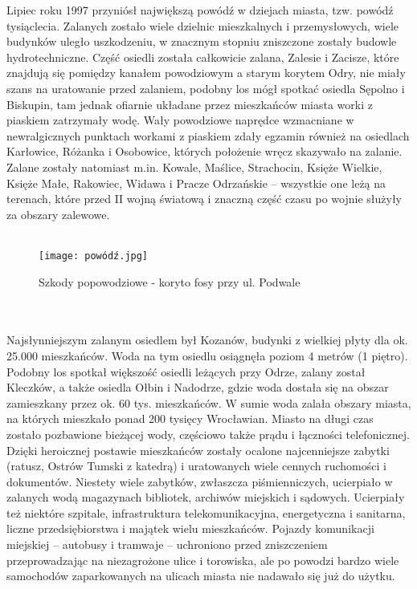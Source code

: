 \documentclass[12pt]{article}
\begin{document}
Lipiec roku 1997 przyniósł największą powódź w dziejach miasta, tzw. powódź tysiąclecia. Zalanych zostało wiele dzielnic mieszkalnych i przemysłowych, wiele budynków uległo uszkodzeniu, w znacznym stopniu zniszczone zostały budowle hydrotechniczne. Część osiedli została całkowicie zalana, Zalesie i Zacisze, które znajdują się pomiędzy kanałem powodziowym a starym korytem Odry, nie miały szans na uratowanie przed zalaniem, podobny los mógł spotkać osiedla Sępolno i Biskupin, tam jednak ofiarnie układane przez mieszkańców miasta worki z piaskiem zatrzymały wodę. Wały powodziowe naprędce wzmacniane w newralgicznych punktach workami z piaskiem zdały egzamin również na osiedlach Karłowice, Różanka i Osobowice, których położenie wręcz skazywało na zalanie. Zalane zostały natomiast m.in. Kowale, Maślice, Strachocin, Księże Wielkie, Księże Małe, Rakowiec, Widawa i Pracze Odrzańskie – wszystkie one leżą na terenach, które przed II wojną światową i znaczną część czasu po wojnie służyły za obszary zalewowe.\\\\
\begin{figure}[h]
    \centering
    \texttt{[image: powódź.jpg]}
    \caption{Szkody popowodziowe - koryto fosy przy ul. Podwale}
    \label{fig:powódź}
\end{figure}\\\\
Najsłynniejszym zalanym osiedlem był Kozanów, budynki z wielkiej płyty dla ok. 25.000 mieszkańców. Woda na tym osiedlu osiągnęła poziom 4 metrów (1 piętro). Podobny los spotkał większość osiedli leżących przy Odrze, zalany został Kleczków, a także osiedla Ołbin i Nadodrze, gdzie woda dostała się na obszar zamieszkany przez ok. 60 tys. mieszkańców. W sumie woda zalała obszary miasta, na których mieszkało ponad 200 tysięcy Wrocławian. Miasto na długi czas zostało pozbawione bieżącej wody, częściowo także prądu i łączności telefonicznej. Dzięki heroicznej postawie mieszkańców zostały ocalone najcenniejsze zabytki (ratusz, Ostrów Tumski z katedrą) i uratowanych wiele cennych ruchomości i dokumentów. Niestety wiele zabytków, zwłaszcza piśmienniczych, ucierpiało w zalanych wodą magazynach bibliotek, archiwów miejskich i sądowych. Ucierpiały też niektóre szpitale, infrastruktura telekomunikacyjna, energetyczna i sanitarna, liczne przedsiębiorstwa i majątek wielu mieszkańców. Pojazdy komunikacji miejskiej – autobusy i tramwaje – uchroniono przed zniszczeniem przeprowadzając na niezagrożone ulice i torowiska, ale po powodzi bardzo wiele samochodów zaparkowanych na ulicach miasta nie nadawało się już do użytku.
\end{document}
